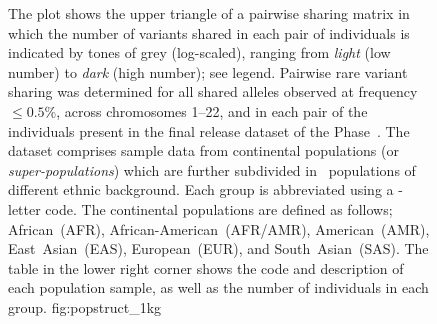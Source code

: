 

\begin{figure}[p]
{The plot shows the upper triangle of a pairwise sharing matrix in which the number of variants shared in each pair of individuals is indicated by tones of grey (log-scaled), ranging from \emph{light} (low number) to \emph{dark} (high number); see legend.
Pairwise rare variant sharing was determined for all shared alleles observed at  frequency ${\leq 0.5\%}$, across chromosomes 1--22, and in each pair of the  individuals present in the final release dataset of the  Phase~.
The dataset comprises sample data from  continental populations (or \emph{super-populations}) which are further subdivided in ~populations of different ethnic background.
Each group is abbreviated using a -letter code.
The  continental populations are defined as follows;
African~(AFR), African-American~(AFR/AMR), American~(AMR), East~Asian~(EAS), European~(EUR), and South~Asian~(SAS).
The table in the lower right corner shows the code and description of each  population sample, as well as the number of individuals in each group.}
{fig:popstruct_1kg}
\end{figure}
